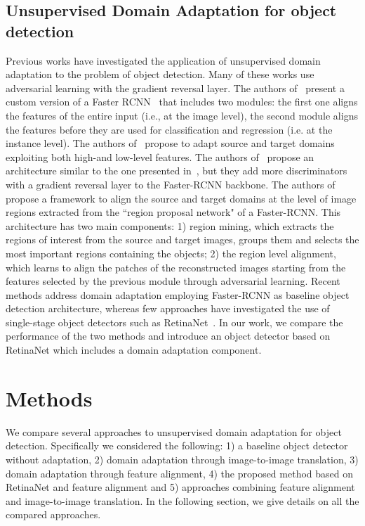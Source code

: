 \documentclass[preprint]{elsarticle}
\begin{document}
\subsection{Unsupervised Domain Adaptation for object detection}
Previous works have investigated the application of unsupervised domain adaptation to the problem of object detection. Many of these works use adversarial learning with the gradient reversal layer. The authors of~\cite{chen2018domain} present a custom version of a Faster RCNN~\cite{DBLP:journals/corr/RenHG015} that includes two modules: the first one aligns the features of the entire input (i.e., at the image level), the second module aligns the features before they are used for classification and regression (i.e. at the instance level). The authors of~\cite{Saito_2019} propose to adapt source and target domains exploiting both high-and low-level features. The authors of~\cite{Xie_2019} propose an architecture similar to the one presented in~\cite{chen2018domain}, but they add more discriminators with a gradient reversal layer to the Faster-RCNN backbone. The authors of~\cite{Zhu_2019_CVPR} propose a framework to align the source and target domains at the level of image regions extracted from the ``region proposal network" of a Faster-RCNN. This architecture has two main components: 1) region mining, which extracts the regions of interest from the source and target images, groups them and selects the most important regions containing the objects; 2) the region level alignment, which learns to align the patches of the reconstructed images starting from the features selected by the previous module through adversarial learning. \newline
Recent methods address domain adaptation employing Faster-RCNN as baseline object detection architecture, whereas few approaches have investigated the use of single-stage object detectors such as RetinaNet~\cite{DBLP:journals/corr/abs-1708-02002}. In our work, we compare the performance of the two methods and introduce an object detector based on RetinaNet which includes a domain adaptation component.
\section{Methods}
\label{methods}
We compare several approaches to unsupervised domain adaptation for object detection. Specifically we considered the following: 1) a baseline object detector without adaptation, 2) domain adaptation through image-to-image translation, 3) domain adaptation through feature alignment, 4) the proposed method based on RetinaNet and feature alignment and 5) approaches combining feature alignment and image-to-image translation. In the following section, we give details on all the compared approaches.
\end{document}
